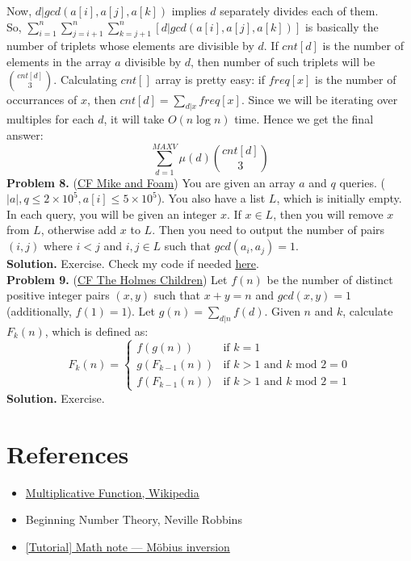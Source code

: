 \documentclass[11pt]{article}
\begin{document}
Now, $d | gcd(a[i], a[j], a[k])$ implies $d$ separately divides each of them.\\ So, $\sum_{i = 1}^{n} \sum_{j = i + 1}^{n} \sum_{k = j + 1}^{n} [d | gcd(a[i], a[j], a[k])]$ is basically the number of triplets whose elements are divisible by $d$. If $cnt[d]$ is the number of elements in the array $a$ divisible by $d$, then number of such triplets will be $\binom{cnt[d]}{3}$. Calculating $cnt[]$ array is pretty easy: if $freq[x]$ is the number of occurrances of $x$, then $cnt[d] = \sum_{d | x} freq[x]$. Since we will be iterating over multiples for each $d$, it will take $O(n \log n)$ time. Hence we get the final answer:
$$\sum_{d = 1}^{MAXV} \mu(d) \binom{cnt[d]}{3}$$
\textbf{Problem 8.} (\href{https://codeforces.com/contest/547/problem/C}{CF Mike and Foam}) You are given an array $a$ and $q$ queries. ($|a|, q \leq 2 \times 10^5, a[i] \leq 5 \times 10^5$). You also have a list $L$, which is initially empty. In each query, you will be given an integer $x$. If $x \in L$, then you will remove $x$ from $L$, otherwise add $x$ to $L$. Then you need to output the number of pairs $(i, j)$ where $i < j$ and $i, j \in L$ such that $gcd(a_i, a_j) = 1$.\\
\textbf{Solution. } Exercise. Check my code if needed \href{https://codeforces.com/contest/547/submission/230499666}{here}.\\
\textbf{Problem 9.} (\href{https://codeforces.com/contest/776/problem/E}{CF The Holmes Children}) Let $f(n)$ be the number of distinct positive integer pairs $(x, y)$ such that $x + y = n$ and $gcd(x, y) = 1$ (additionally, $f(1) = 1$). Let $g(n) = \sum_{d | n} f(d)$. Given $n$ and $k$, calculate $F_k (n)$, which is defined as:
$$F_k(n) = \begin{cases}
  f(g(n)) & \text{if } k = 1 \\
  g(F_{k - 1}(n)) & \text{if } k > 1 \text{ and } k \text{ mod } 2 = 0 \\
  f(F_{k - 1}(n)) & \text{if } k > 1 \text{ and } k \text{ mod } 2 = 1
\end{cases}$$
\textbf{Solution. } Exercise. 
\section*{References}
\begin{itemize}
  \item \href{https://en.wikipedia.org/wiki/Multiplicative_function}{Multiplicative Function, Wikipedia}
  \item Beginning Number Theory, Neville Robbins
  \item \href{https://codeforces.com/blog/entry/53925}{[Tutorial] Math note — Möbius inversion}
\end{itemize}
\end{document}
